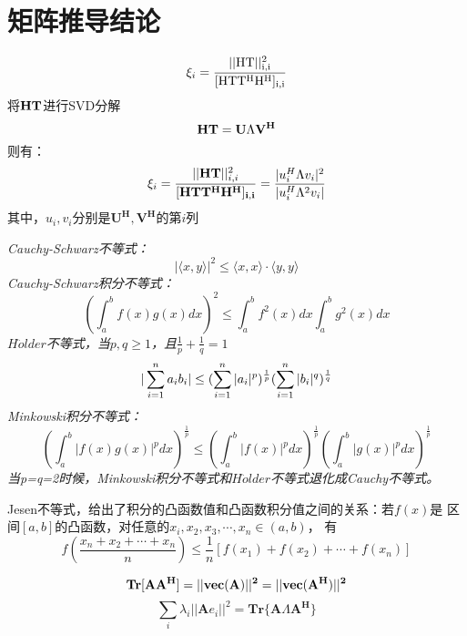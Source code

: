\documentclass[fontset=none,oneside]{book}
\begin{document}
\section{矩阵推导结论}
\begin{equation}
\xi_i=\frac{||\rm{H}\rm{T}||_{i,i}^2}{[\rm{HTT^HH^H}]_{i,i}}
\end{equation}
将${\bf HT}$进行SVD分解
\begin{equation}
{\bf HT=U}\Lambda{\bf V^H }
\end{equation}
则有：
\begin{equation}
\xi_i=\frac{||{\bf HT}||_{i,i}^2}{[\bf{HTT^HH^H}]_{i,i}}=\frac{|u_i^H\Lambda v_i|^2}{|u_i^H\Lambda^2v_i|}
\end{equation}
其中，$u_i,v_i$分别是$\mathbf{U^H,V^H}$的第$i$列
\begin{shaded}
\noindent
\emph{
Cauchy-Schwarz不等式：
\begin{equation}
|\langle x,y \rangle|^2\leq \langle x,x \rangle\cdot\langle y,y \rangle
\end{equation}
}
\emph{Cauchy-Schwarz积分不等式：
\begin{equation}
(\int_{a}^{b}f(x)g(x)dx)^2\leq \int_{a}^{b}f^2(x)dx\int_{a}^{b}g^2(x)dx
\end{equation}
}
\emph{$H\ddot{o}lder$不等式，当$p,q\geq 1$，且$\frac{1}{p}+\frac{1}{q}=1$
\begin{equation}
|\sum\limits_{i=1}^{n}a_ib_i|\leq (\sum\limits_{i=1}^{n}|a_i|^p)^{1\over p}(\sum\limits_{i=1}^{n}|b_i|^q)^{1\over q}
\end{equation}
}
\emph{Minkowski积分不等式：
\begin{equation}
(\int_{a}^{b}|f(x)g(x)|^pdx)^{\frac{1}{p}} \leq (\int_{a}^{b}|f(x)|^pdx)^{\frac{1}{p}} (\int_{a}^{b}|g(x)|^pdx)^{\frac{1}{p}}
\end{equation}
}
\emph{当p=q=2时候，Minkowski积分不等式和$H\ddot{o}lder$不等式退化成Cauchy不等式。}
\end{shaded}

\begin{shaded}
Jesen不等式，给出了积分的凸函数值和凸函数积分值之间的关系：若$f(x)$是
区间$[a,b]$的凸函数，对任意的$x_{i},x_{2},x_{3},\cdots,x_{n}\in (a,b)$，
有
\begin{equation}
\label{eq:1}
f(\frac{x_{n}+x_{2}+\cdots+x_{n}}{n})\leq \frac{1}{n}[f(x_{1})+f(x_{2})+\cdots+f(x_{n})]
\end{equation}
\end{shaded}

\begin{shaded}
\begin{equation}
\label{eq:2}
{\bf Tr[AA^{H}]=||vec(A)||^{2}=||vec{(A^{H})||^{2}}}
\end{equation}
\begin{equation}
\label{eq:3}
\sum_{i}\lambda_{i}||\mathbf{A}e_{i}||^{2}= \mathbf{Tr} \{\mathbf{A} \Lambda \mathbf{A^{H}}
    \}
\end{equation}
\end{shaded}
\end{document}
